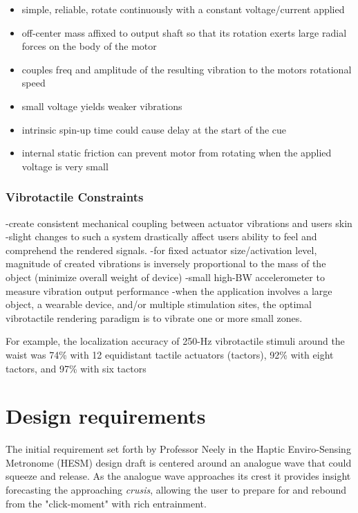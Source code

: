 \begin{enumerate}
\begin{itemize}
        \item simple, reliable, rotate continuously with a constant voltage/current applied
        \item off-center mass affixed to output shaft so that its rotation exerts large radial forces on the body of the motor
        \item couples freq and amplitude of the resulting vibration to the motors rotational speed
        \item small voltage yields weaker vibrations
        \item intrinsic spin-up time could cause delay at the start of the cue
        \item internal static friction can prevent motor from rotating when the applied voltage is very small
    \end{itemize}

\end{enumerate}

\subsubsection{Vibrotactile Constraints}
-create consistent mechanical coupling between actuator vibrations and users skin
-slight changes to such a system drastically affect users ability to feel and comprehend the rendered signals.
-for fixed actuator size/activation level, magnitude of created vibrations is inversely proportional to the mass of the object (minimize overall weight of device)
-small high-BW accelerometer to measure vibration output performance
-when the application involves a large object, a wearable device, and/or multiple stimulation sites, the optimal vibrotactile rendering paradigm is to vibrate one or more small zones.

For example, the localization accuracy of 250-Hz vibrotactile stimuli around the waist was 74\% with 12 equidistant tactile actuators (tactors), 92\% with eight tactors, and 97\% with six tactors 		



\section{Design requirements}

The initial requirement set forth by Professor Neely in the Haptic Enviro-Sensing Metronome (HESM) design draft is centered around an analogue wave that could squeeze and release. As the analogue wave approaches its crest it provides insight forecasting the approaching \textit{crusis}, allowing the user to prepare for and rebound from the "click-moment" with rich entrainment. 

